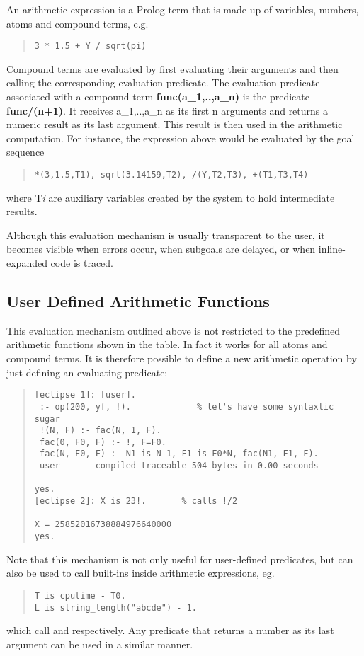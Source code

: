 An arithmetic expression is a Prolog term that is made up of variables,
numbers, atoms and compound terms, e.g.
\begin{quote}
\begin{verbatim}
3 * 1.5 + Y / sqrt(pi)
\end{verbatim}\end{quote}
Compound terms are evaluated by first evaluating their arguments and then
calling the corresponding evaluation predicate.
The evaluation predicate associated with a compound term {\bf func(a_1,..,a_n)}
is the predicate {\bf func/(n+1)}. It receives a_1,..,a_n as its first
n arguments and returns a numeric result as its last argument.
This result is then used in the arithmetic computation.
For instance, the expression above would be evaluated by the goal sequence
\begin{quote}
\begin{verbatim}
*(3,1.5,T1), sqrt(3.14159,T2), /(Y,T2,T3), +(T1,T3,T4)
\end{verbatim}\end{quote}
where T{\it i} are auxiliary variables created by the system to hold
intermediate results.

Although this evaluation mechanism is usually transparent to the user, it
becomes visible when errors occur, when subgoals are delayed, or
when inline-expanded code is traced.

\subsection{User Defined Arithmetic Functions}
This evaluation mechanism outlined above is not restricted to the
predefined arithmetic functions shown in the table.
In fact it works for all atoms and compound terms.
It is therefore possible to define a new arithmetic operation by
just defining an evaluating predicate:
\begin{quote}
\begin{verbatim}
[eclipse 1]: [user].
 :- op(200, yf, !).             % let's have some syntaxtic sugar
 !(N, F) :- fac(N, 1, F).
 fac(0, F0, F) :- !, F=F0.
 fac(N, F0, F) :- N1 is N-1, F1 is F0*N, fac(N1, F1, F).
 user       compiled traceable 504 bytes in 0.00 seconds

yes.
[eclipse 2]: X is 23!.       % calls !/2

X = 25852016738884976640000
yes.
\end{verbatim}\end{quote}
Note that this mechanism is not only useful for user-defined predicates, but
can also be used to call {\eclipse} built-ins inside arithmetic expressions, eg.
\begin{quote}
\begin{verbatim}
T is cputime - T0.
L is string_length("abcde") - 1.
\end{verbatim}\end{quote}
which call  and  respectively.
Any predicate that returns a number as its last argument
can be used in a similar manner.

